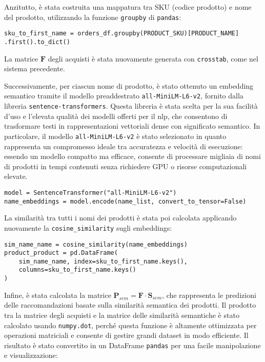 Anzitutto, è stata costruita una mappatura tra SKU (codice prodotto) e nome del prodotto, utilizzando la funzione \texttt{groupby} di \texttt{pandas}:

\begin{lstlisting}
sku_to_first_name = orders_df.groupby(PRODUCT_SKU)[PRODUCT_NAME]
.first().to_dict()
\end{lstlisting}

La matrice $\mathbf{F}$ degli acquisti è stata nuovamente generata con \texttt{crosstab}, come nel sistema precedente.

Successivamente, per ciascun nome di prodotto, è stato ottenuto un embedding semantico tramite il modello preaddestrato \texttt{all-MiniLM-L6-v2}, fornito dalla libreria \texttt{sentence-transformers}. Questa libreria è stata scelta per la sua facilità d’uso e l’elevata qualità dei modelli offerti per il \gls{nlp}, che consentono di trasformare testi in rappresentazioni vettoriali dense con significato semantico. In particolare, il modello \texttt{all-MiniLM-L6-v2} è stato selezionato in quanto rappresenta un compromesso ideale tra accuratezza e velocità di esecuzione: essendo un modello compatto ma efficace, consente di processare migliaia di nomi di prodotti in tempi contenuti senza richiedere GPU o risorse computazionali elevate.

\begin{lstlisting}
model = SentenceTransformer("all-MiniLM-L6-v2")
name_embeddings = model.encode(name_list, convert_to_tensor=False)
\end{lstlisting}

La similarità tra tutti i nomi dei prodotti è stata poi calcolata applicando nuovamente la \texttt{cosine\_similarity} sugli embeddings:

\begin{lstlisting}
sim_name_name = cosine_similarity(name_embeddings)
product_product = pd.DataFrame(
    sim_name_name, index=sku_to_first_name.keys(),
    columns=sku_to_first_name.keys()
)
\end{lstlisting}

Infine, è stata calcolata la matrice $\mathbf{P}_{sem} = \mathbf{F} \cdot \mathbf{S}_{sem}$, che rappresenta le predizioni delle raccomandazioni basate sulla similarità semantica dei prodotti. Il prodotto tra la matrice degli acquisti e la matrice delle similarità semantiche è stato calcolato usando \texttt{numpy.dot}, perché questa funzione è altamente ottimizzata per operazioni matriciali e consente di gestire grandi dataset in modo efficiente. Il risultato è stato convertito in un DataFrame \texttt{pandas} per una facile manipolazione e visualizzazione:

